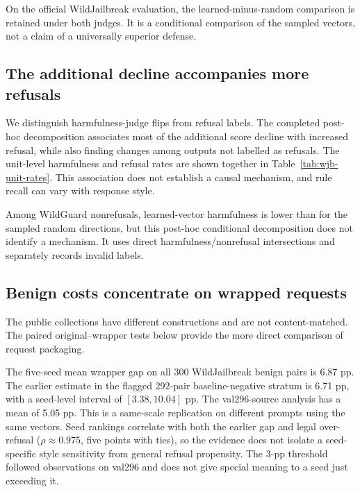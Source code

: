 On the official WildJailbreak evaluation, the learned-minus-random comparison is retained under both judges. It is a conditional comparison of the sampled vectors, not a claim of a universally superior defense.







\subsection{The additional decline accompanies more refusals}
We distinguish harmfulness-judge flips from refusal labels. The completed post-hoc decomposition associates most of the additional score decline with increased refusal, while also finding changes among outputs not labelled as refusals. The unit-level harmfulness and refusal rates are shown together in Table~\ref{tab:wjb-unit-rates}. This association does not establish a causal mechanism, and rule recall can vary with response style.

Among WildGuard nonrefusals, learned-vector harmfulness is lower than for the sampled random directions, but this post-hoc conditional decomposition does not identify a mechanism. It uses direct harmfulness/nonrefusal intersections and separately records invalid labels.


\subsection{Benign costs concentrate on wrapped requests}


The public collections have different constructions and are not content-matched. The paired original--wrapper tests below provide the more direct comparison of request packaging.


The five-seed mean wrapper gap on all 300 WildJailbreak benign pairs is 6.87 pp. The earlier estimate in the flagged 292-pair baseline-negative stratum is 6.71 pp, with a seed-level interval of $[3.38,10.04]$ pp. The val296-source analysis has a mean of 5.05 pp. This is a same-scale replication on different prompts using the same vectors. Seed rankings correlate with both the earlier gap and legal over-refusal ($\rho\approx0.975$, five points with ties), so the evidence does not isolate a seed-specific style sensitivity from general refusal propensity. The 3-pp threshold followed observations on val296 and does not give special meaning to a seed just exceeding it.

